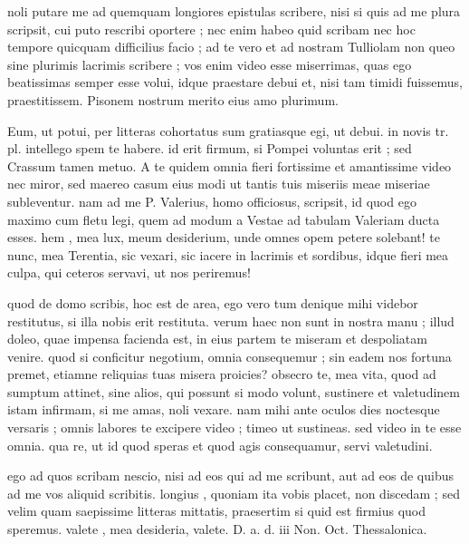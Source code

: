 


 noli putare me ad quemquam longiores epistulas scribere, nisi si quis ad me plura scripsit, cui puto rescribi oportere ; nec enim habeo quid scribam nec hoc tempore quicquam difficilius facio ; ad te vero et ad nostram Tulliolam non queo sine plurimis lacrimis scribere ; vos enim video esse miserrimas, quas ego beatissimas semper esse volui, idque praestare debui et, nisi tam timidi fuissemus, praestitissem. Pisonem nostrum merito eius amo plurimum.

 Eum, ut potui, per litteras cohortatus sum gratiasque egi, ut debui. in novis tr. pl. intellego spem te habere. id erit firmum, si Pompei voluntas erit ; sed Crassum tamen metuo. A te quidem omnia fieri fortissime et amantissime video nec miror, sed maereo casum eius modi ut tantis tuis miseriis meae miseriae subleventur. nam ad me P. Valerius, homo officiosus, scripsit, id quod ego maximo cum fletu legi, quem ad modum a Vestae ad tabulam Valeriam ducta esses. hem , mea lux, meum desiderium, unde omnes opem petere solebant! te nunc, mea Terentia, sic vexari, sic iacere in lacrimis et sordibus, idque fieri mea culpa, qui ceteros servavi, ut nos periremus!

 quod de domo scribis, hoc est de area, ego vero tum denique mihi videbor restitutus, si illa nobis erit restituta. verum haec non sunt in nostra manu ; illud doleo, quae impensa facienda est, in eius partem te miseram et despoliatam venire. quod si conficitur negotium, omnia consequemur ; sin eadem nos fortuna premet, etiamne reliquias tuas misera proicies? obsecro te, mea vita, quod ad sumptum attinet, sine alios, qui possunt si modo volunt, sustinere et valetudinem istam infirmam, si me amas, noli vexare. nam mihi ante oculos dies noctesque versaris ; omnis labores te excipere video ; timeo ut sustineas. sed video in te esse omnia. qua re, ut id quod speras et quod agis consequamur, servi valetudini.

 ego ad quos scribam nescio, nisi ad eos qui ad me scribunt, aut ad eos de quibus ad me vos aliquid scribitis. longius , quoniam ita vobis placet, non discedam ; sed velim quam saepissime litteras mittatis, praesertim si quid est firmius quod speremus. valete , mea desideria, valete. D. a. d. iii Non. Oct. Thessalonica.

